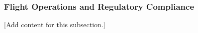 
\subsubsection{Flight Operations and Regulatory Compliance}
\label{subsubsec:design_8_7_flight_ops_regulatory}

[Add content for this subsection.]
